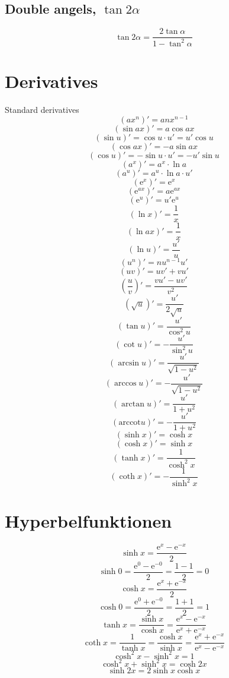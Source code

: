 \documentclass[a4paper, 10pt]{scrartcl}
\newcommand*\euler{\mathrm{e}}
\newcommand*\arccot{\mathrm{arccot}}
\begin{document}
\subsection{Double angels, $\tan{2\alpha}$}
\[\tan{2\alpha} = \frac{2\tan{\alpha}}{1 - \tan^{2}{\alpha}}\]

\section{Derivatives}

Standard derivatives
\[(ax^{n})' = anx^{n-1}\]
\[(\sin{ax})' = a\cos{ax}\]
\[(\sin{u})' = \cos{u}\cdot u' = u'\cos{u}\]
\[(\cos{ax})' = -a\sin{ax}\]
\[(\cos{u})' = -\sin{u}\cdot u' = -u'\sin{u}\]
\[(a^{x})' = a^{x}\cdot\ln{a}\]
\[(a^{u})' = a^{u}\cdot\ln{a}\cdot u'\]
\[(\euler^{x})' = \euler^{x}\]
\[(\euler^{ax})' = a\euler^{ax}\]
\[(\euler^{u})' = u'\euler^{u}\]
\[(\ln{x})' = \frac{1}{x}\]
\[(\ln{ax})' = \frac{1}{x}\]
\[(\ln{u})' = \frac{u'}{u}\]
\[(u^{n})' = nu^{n-1}u'\]
\[(uv)' = uv' + vu'\]
\[\left(\frac{u}{v}\right)' = \frac{vu' - uv'}{v^{2}}\]
\[\left(\sqrt{u}\right)' = \frac{u'}{2\sqrt{u}}\]
\[(\tan{u})' = \frac{u'}{\cos^{2}{u}}\]
\[(\cot{u})' = -\frac{u'}{\sin^{2}{u}}\]
\[(\arcsin{u})' = \frac{u'}{\sqrt{1 - u^{2}}}\]
\[(\arccos{u})' = -\frac{u'}{\sqrt{1 - u^{2}}}\]
\[(\arctan{u})' = \frac{u'}{1 + u^{2}}\]
\[(\arccot{u})' = -\frac{u'}{1 + u^{2}}\]
\[(\sinh{x})' = \cosh{x}\]
\[(\cosh{x})' = \sinh{x}\]
\[(\tanh{x})' = \frac{1}{\cosh^{2}{x}}\]
\[(\coth{x})' = -\frac{1}{\sinh^{2}{x}}\]

\section{Hyperbelfunktionen}
\[\sinh{x} = \frac{\euler^{x} - \euler^{-x}}{2}\]
\[\sinh{0} = \frac{\euler^{0} - \euler^{-0}}{2} = \frac{1 - 1}{2} = 0\]
\[\cosh{x} = \frac{\euler^{x} + \euler^{-x}}{2}\]
\[\cosh{0} = \frac{\euler^{0} + \euler^{-0}}{2} = \frac{1 + 1}{2} = 1\]
\[\tanh{x} = \frac{\sinh{x}}{\cosh{x}} = \frac{\euler^{x} - \euler^{-x}}{\euler^{x} + \euler^{-x}}\]
\[\coth{x} = \frac{1}{\tanh{x}} = \frac{\cosh{x}}{\sinh{x}} = \frac{\euler^{x} + \euler^{-x}}{\euler^{x} - \euler^{-x}}\]
\[\cosh^{2}{x} - \sinh^{2}{x} = 1\]
\[\cosh^{2}{x} + \sinh^{2}{x} = \cosh{2x}\]
\[\sinh{2x} = 2\sinh{x}\cosh{x}\]
\end{document}
